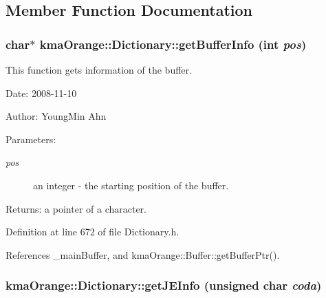 \subsection{Member Function Documentation}
\hypertarget{classkmaOrange_1_1Dictionary_77314f5503275a31fda9b61bc2744ff0}{
\subsubsection[{getBufferInfo}]{\setlength{\rightskip}{0pt plus 5cm}char$\ast$ kmaOrange::Dictionary::getBufferInfo (int {\em pos})}}
\label{classkmaOrange_1_1Dictionary_77314f5503275a31fda9b61bc2744ff0}


This function gets information of the buffer. 

\begin{Desc}
\item[Date:]2008-11-10 \end{Desc}
\begin{Desc}
\item[Author:]YoungMin Ahn \end{Desc}
\begin{Desc}
\item[Parameters:]
\begin{description}
\item[{\em pos}]an integer - the starting position of the buffer. \end{description}
\end{Desc}
\begin{Desc}
\item[Returns:]a pointer of a character. \end{Desc}


Definition at line 672 of file Dictionary.h.

References \_\-mainBuffer, and kmaOrange::Buffer::getBufferPtr().\hypertarget{classkmaOrange_1_1Dictionary_37f831e5568bb08887804e486b7d6bea}{
\subsubsection[{getJEInfo}]{ kmaOrange::Dictionary::getJEInfo (unsigned char {\em coda})}}
\label{classkmaOrange_1_1Dictionary_37f831e5568bb08887804e486b7d6bea}


